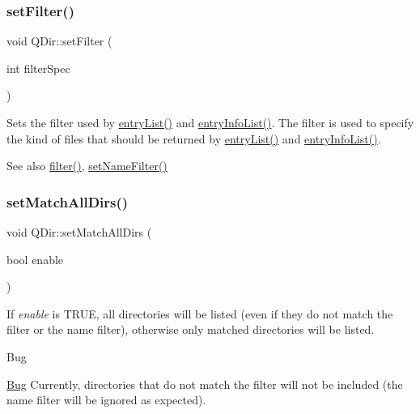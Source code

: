 \subsubsection{\texorpdfstring{setFilter()}{setFilter()}}
{\footnotesize\ttfamily void Q\+Dir\+::set\+Filter (\begin{DoxyParamCaption}\item[{int}]{filter\+Spec }\end{DoxyParamCaption})\hspace{0.3cm}{\ttfamily [virtual]}}

Sets the filter used by \mbox{\hyperlink{class_q_dir_ab5e2b4ce772dc4b8941425cf780df9ab}{entry\+List()}} and \mbox{\hyperlink{class_q_dir_ada9ea9da108cbebd0ac88231f39fced0}{entry\+Info\+List()}}. The filter is used to specify the kind of files that should be returned by \mbox{\hyperlink{class_q_dir_ab5e2b4ce772dc4b8941425cf780df9ab}{entry\+List()}} and \mbox{\hyperlink{class_q_dir_ada9ea9da108cbebd0ac88231f39fced0}{entry\+Info\+List()}}.

\begin{DoxySeeAlso}{See also}
\mbox{\hyperlink{class_q_dir_a55b8ed62e97891ffc50d0c4a2b8fe31d}{filter()}}, \mbox{\hyperlink{class_q_dir_a26b95e183a9ba9410219a3ce4d8c3416}{set\+Name\+Filter()}} 
\end{DoxySeeAlso}
\mbox{\label{class_q_dir_aec96bf79103196eefd2a38ff74aeadd0}} 
\subsubsection{\texorpdfstring{setMatchAllDirs()}{setMatchAllDirs()}}
{\footnotesize\ttfamily void Q\+Dir\+::set\+Match\+All\+Dirs (\begin{DoxyParamCaption}\item[{bool}]{enable }\end{DoxyParamCaption})\hspace{0.3cm}{\ttfamily [virtual]}}

If {\itshape enable} is T\+R\+UE, all directories will be listed (even if they do not match the filter or the name filter), otherwise only matched directories will be listed.

\begin{DoxyRefDesc}{Bug}
\item[\mbox{\hyperlink{bug__bug000002}{Bug}}]Currently, directories that do not match the filter will not be included (the name filter will be ignored as expected).\end{DoxyRefDesc}


